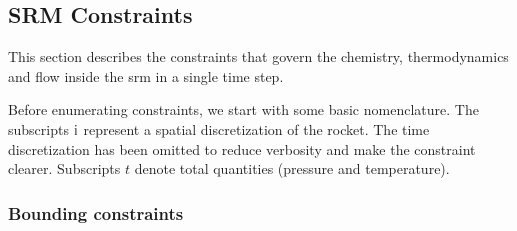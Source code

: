 
\subsection{SRM Constraints}

This section describes the constraints that govern the chemistry, thermodynamics
and flow inside the \gls{srm} in a single time step.

Before enumerating constraints, we start with some basic nomenclature. The subscripts $\rm{i}$
represent a spatial discretization of the rocket. The time discretization has been omitted to
reduce verbosity and make the constraint clearer. Subscripts $t$ denote total quantities
(pressure and temperature).

\subsubsection{Bounding constraints}


